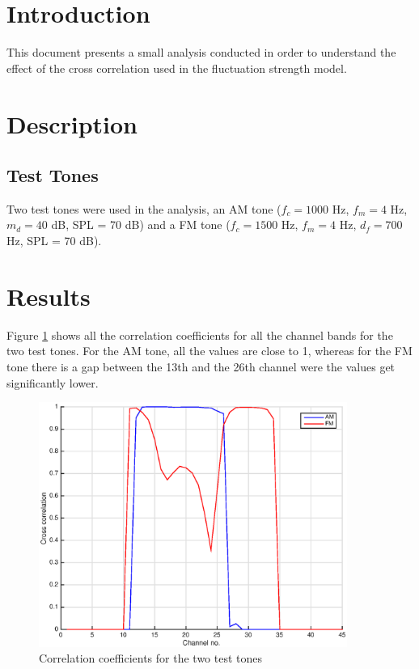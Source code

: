 \documentclass[a4paper]{article}
\begin{document}

\section{Introduction}

This document presents a small analysis conducted in order to understand the
effect of the cross correlation used in the fluctuation strength model.

\section{Description}

\subsection{Test Tones}

Two test tones were used in the analysis, an AM tone ($f_c = 1000$ Hz, $f_m = 4$
Hz, $m_d = 40$ dB, SPL = 70 dB) and a FM tone ($f_c = 1500$ Hz, $f_m = 4$ Hz,
$d_f = 700$ Hz, SPL = 70 dB).

\section{Results}

Figure \ref{fig:corr} shows all the correlation coefficients for all the
channel bands for the two test tones. For the AM tone, all the values are close
to 1, whereas for the FM tone there is a gap between the 13th and the 26th
channel were the values get significantly lower.

\begin{figure}[ht]
    \centering
    \includegraphics[height=8cm]{img/model_correlations_AM_FM}
    \caption{Correlation coefficients for the two test tones}
    \label{fig:corr}
\end{figure}
\end{document}
